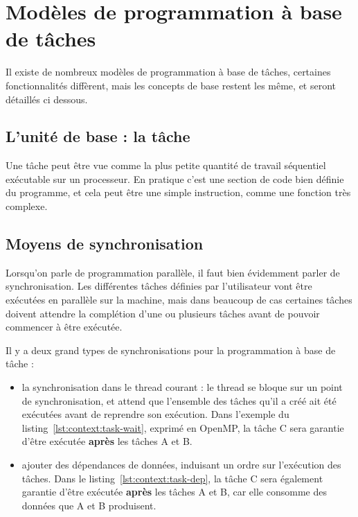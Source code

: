 \section{Modèles de programmation à base de tâches}\label{sec:context:others}

Il existe de nombreux modèles de programmation à base de tâches, certaines fonctionnalités diffèrent, mais les concepts de base restent les même, et seront détaillés ci dessous.

\subsection{L'unité de base : la tâche}

Une tâche peut être vue comme la plus petite quantité de travail séquentiel exécutable sur un processeur.
En pratique c'est une section de code bien définie du programme, et cela peut être une simple instruction, comme une fonction très complexe.

\subsection{Moyens de synchronisation}

Lorsqu'on parle de programmation parallèle, il faut bien évidemment parler de synchronisation.
Les différentes tâches définies par l'utilisateur vont être exécutées en parallèle sur la machine, mais dans beaucoup de cas certaines tâches doivent attendre la complétion d'une ou plusieurs tâches avant de pouvoir commencer à être exécutée.

Il y a deux grand types de synchronisations pour la programmation à base de tâche :

\begin{itemize}
  \item la synchronisation dans le thread courant : le thread se bloque sur un point de synchronisation, et attend que l'ensemble des tâches qu'il a créé ait été exécutées avant de reprendre son exécution. Dans l'exemple du listing~\ref{lst:context:task-wait}, exprimé en OpenMP, la tâche C sera garantie d'être exécutée \textbf{après} les tâches A et B.
  \item ajouter des dépendances de données, induisant un ordre sur l'exécution des tâches. Dans le listing~\ref{lst:context:task-dep}, la tâche C sera également garantie d'être exécutée \textbf{après} les tâches A et B, car elle consomme des données que A et B produisent.
\end{itemize}

